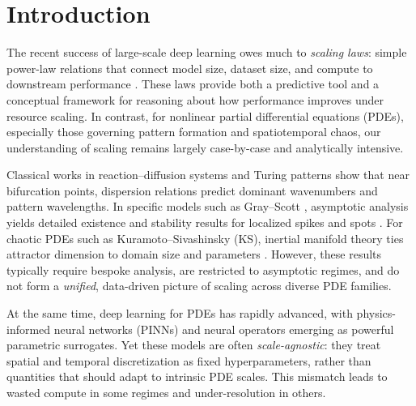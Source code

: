 \documentclass{article}
\theoremstyle{plain}
\theoremstyle{definition}
\theoremstyle{remark}
\begin{document}
\section{Introduction}

The recent success of large-scale deep learning owes much to \emph{scaling laws}: simple power-law relations that connect model size, dataset size, and compute to downstream performance \citep{Kaplan2020ScalingLaws,Hoffmann2022Chinchilla,Bahri2024ExplainingScaling,Sengupta2025ScalingSurvey}. These laws provide both a predictive tool and a conceptual framework for reasoning about how performance improves under resource scaling. In contrast, for nonlinear partial differential equations (PDEs), especially those governing pattern formation and spatiotemporal chaos, our understanding of scaling remains largely case-by-case and analytically intensive.

Classical works in reaction--diffusion systems and Turing patterns \citep{Cross1993Pattern,Koch1994BiologicalPattern,Murray2003MathBioII,Maini2004PatternBiology} show that near bifurcation points, dispersion relations predict dominant wavenumbers and pattern wavelengths. In specific models such as Gray--Scott \citep{Gray1983Autocatalytic,Gray1984Oscillations,Pearson1993Complex,McGough2004PatternGS,Gandy2022GrayScottXPPAUT,Ali2023GrayScottTuring}, asymptotic analysis yields detailed existence and stability results for localized spikes and spots \citep{Doelman1997Localized,Kolokolnikov2005Spike1D,Sun2005TwoSpike,Chen2011GS2DSpots,Ward2006AsymptoticRD}. For chaotic PDEs such as Kuramoto--Sivashinsky (KS), inertial manifold theory ties attractor dimension to domain size and parameters \citep{Jolly2000InertialKS,WittenbergHolmes1999KSScale}. However, these results typically require bespoke analysis, are restricted to asymptotic regimes, and do not form a \emph{unified}, data-driven picture of scaling across diverse PDE families.

At the same time, deep learning for PDEs has rapidly advanced, with physics-informed neural networks (PINNs) \citep{Raissi2019PINN,Cai2021PINNFluidReview} and neural operators \citep{Li2021FNO,Kovachki2021NeuralOperator,Lu2021DeepONet,Tripura2022WaveletNO,Cao2024LaplaceNO,Xiong2024KoopmanNO} emerging as powerful parametric surrogates. Yet these models are often \emph{scale-agnostic}: they treat spatial and temporal discretization as fixed hyperparameters, rather than quantities that should adapt to intrinsic PDE scales. This mismatch leads to wasted compute in some regimes and under-resolution in others.
\end{document}
